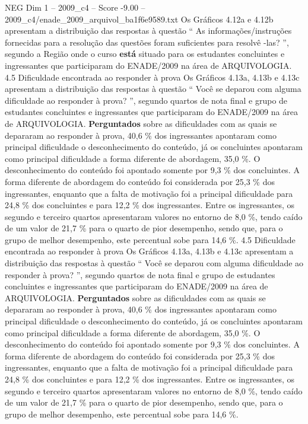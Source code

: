 \begin{textsample}{NEG Dim 1 – 2009\_c4 – Score -9.00 – 2009\_c4/enade\_2009\_arquivol\_ba1f6e9589.txt}
Os Gráficos 4.12a e 4.12b apresentam a distribuição das respostas à questão “ As informações/instruções fornecidas para a resolução das questões foram suficientes para resolvê -las? ”, segundo a Região onde o curso \textbf{está} situado para os estudantes concluintes e ingressantes que participaram do ENADE/2009 na área de ARQUIVOLOGIA. 4.5 Dificuldade encontrada ao responder à prova Os Gráficos 4.13a, 4.13b e 4.13c apresentam a distribuição das respostas à questão “ Você se deparou com alguma dificuldade ao responder à prova? ”, segundo quartos de nota final e grupo de estudantes concluintes e ingressantes que participaram do ENADE/2009 na área de ARQUIVOLOGIA. \textbf{Perguntados} sobre as dificuldades com as quais se depararam ao responder à prova, 40,6 \% dos ingressantes apontaram como principal dificuldade o desconhecimento do conteúdo, já os concluintes apontaram como principal dificuldade a forma diferente de abordagem, 35,0 \%.
O desconhecimento do conteúdo foi apontado somente por 9,3 \% dos concluintes.
A forma diferente de abordagem do conteúdo foi considerada por 25,3 \% dos ingressantes, enquanto que a falta de motivação foi a principal dificuldade para 24,8 \% dos concluintes e para 12,2 \% dos ingressantes.
Entre os ingressantes, os segundo e terceiro quartos apresentaram valores no entorno de 8,0 \%, tendo caído de um valor de 21,7 \% para o quarto de pior desempenho, sendo que, para o grupo de melhor desempenho, este percentual sobe para 14,6 \%. 4.5 Dificuldade encontrada ao responder à prova Os Gráficos 4.13a, 4.13b e 4.13c apresentam a distribuição das respostas à questão “ Você se deparou com alguma dificuldade ao responder à prova? ”, segundo quartos de nota final e grupo de estudantes concluintes e ingressantes que participaram do ENADE/2009 na área de ARQUIVOLOGIA. \textbf{Perguntados} sobre as dificuldades com as quais se depararam ao responder à prova, 40,6 \% dos ingressantes apontaram como principal dificuldade o desconhecimento do conteúdo, já os concluintes apontaram como principal dificuldade a forma diferente de abordagem, 35,0 \%.
O desconhecimento do conteúdo foi apontado somente por 9,3 \% dos concluintes.
A forma diferente de abordagem do conteúdo foi considerada por 25,3 \% dos ingressantes, enquanto que a falta de motivação foi a principal dificuldade para 24,8 \% dos concluintes e para 12,2 \% dos ingressantes.
Entre os ingressantes, os segundo e terceiro quartos apresentaram valores no entorno de 8,0 \%, tendo caído de um valor de 21,7 \% para o quarto de pior desempenho, sendo que, para o grupo de melhor desempenho, este percentual sobe para 14,6 \%.

\end{textsample}
